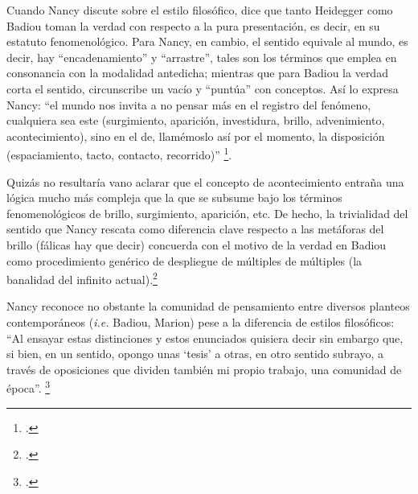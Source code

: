 Cuando Nancy discute sobre el estilo filosófico, dice que tanto Heidegger como Badiou toman la verdad con respecto a la pura presentación, es decir, en su estatuto fenomenológico. Para Nancy, en cambio, el sentido equivale al mundo, es decir, hay \enquote{encadenamiento} y \enquote{arrastre}, tales son los términos que emplea en consonancia con la modalidad antedicha; mientras que para Badiou la verdad corta el sentido, circunscribe un vacío y  \enquote{puntúa} con conceptos. Así lo expresa Nancy: \enquote{el mundo nos invita a no pensar más en el registro del fenómeno, cualquiera sea este (surgimiento, aparición, investidura, brillo, advenimiento, acontecimiento), sino en el de, llamémoslo así por el momento, la disposición (espaciamiento, tacto, contacto, recorrido)} \footcite[21]{@7012-NANCY2009}.

Quizás no resultaría vano aclarar que el concepto de acontecimiento entraña una lógica mucho más compleja que la que se subsume bajo los términos fenomenológicos de brillo, surgimiento, aparición, etc. De hecho, la trivialidad del sentido que Nancy rescata como diferencia clave respecto a las metáforas del brillo (fálicas hay que decir) concuerda con el motivo de la verdad en Badiou como procedimiento genérico de despliegue de múltiples de múltiples (la banalidad del infinito actual).\footcite[22]{@7012-NANCY2009}

Nancy reconoce no obstante la comunidad de pensamiento entre diversos planteos contemporáneos (\emph{i.e.} Badiou, Marion) pese a la diferencia de estilos filosóficos: \enquote{Al ensayar estas distinciones y estos enunciados quisiera decir sin embargo que, si bien, en un sentido, opongo unas \enquote{tesis} a otras, en otro sentido subrayo, a través de oposiciones que dividen también mi propio trabajo, una comunidad de época}. \footcite{@7012-NANCY2009}

